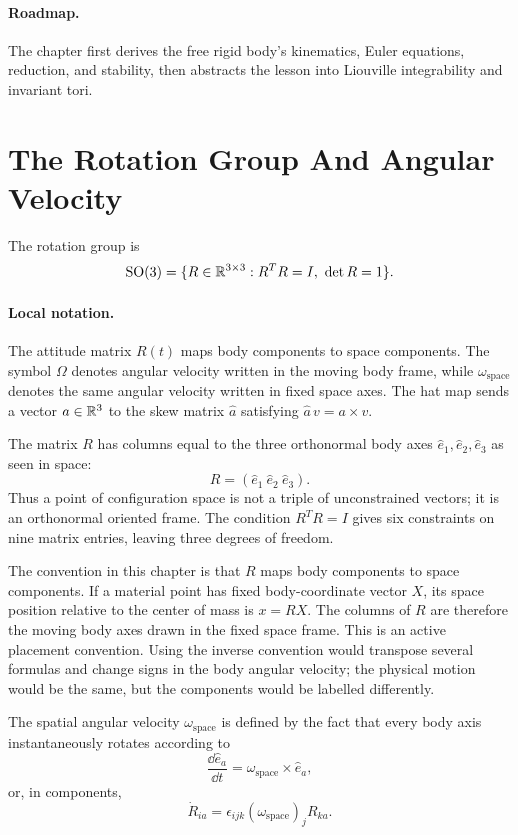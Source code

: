 \paragraph{Roadmap.}
The chapter first derives the free rigid body's kinematics, Euler equations,
reduction, and stability, then abstracts the lesson into Liouville integrability
and invariant tori.

\section{The Rotation Group And Angular Velocity}
\label{sec:rotation-group-angular-velocity}

The rotation group is
\[
  \operatorname{SO}(3)=\{R\in\mathbb{R}^{3\times 3}:R^TR=I,\ \det R=1\}.
\]

\paragraph{Local notation.}
The attitude matrix \(R(t)\) maps body components to space components.  The
symbol \(\Omega\) denotes angular velocity written in the moving body frame,
while \(\omega_{\mathrm{space}}\) denotes the same angular velocity written in
fixed space axes.  The hat map sends a vector \(a\in\mathbb{R}^3\) to the skew matrix
\(\widehat a\) satisfying \(\widehat a\,v=a\times v\).

The matrix \(R\) has columns equal to the three orthonormal body axes
\(\hat e_1,\hat e_2,\hat e_3\) as seen in space:
\[
  R=(\hat e_1\ \hat e_2\ \hat e_3).
\]
Thus a point of configuration space is not a triple of unconstrained vectors;
it is an orthonormal oriented frame. The condition \(R^TR=I\) gives six
constraints on nine matrix entries, leaving three degrees of freedom.

The convention in this chapter is that \(R\) maps body components to space
components.  If a material point has fixed body-coordinate vector \(X\), its
space position relative to the center of mass is \(x=RX\).  The columns of
\(R\) are therefore the moving body axes drawn in the fixed space frame.  This
is an active placement convention.  Using the inverse convention would transpose
several formulas and change signs in the body angular velocity; the physical
motion would be the same, but the components would be labelled differently.

The spatial angular velocity \(\omega_{\mathrm{space}}\) is defined by the fact that every body
axis instantaneously rotates according to
\[
  \frac{\dd \hat e_a}{\dd t}=\omega_{\mathrm{space}}\times\hat e_a,
\]
or, in components,
\[
  \dot R_{ia}=\epsilon_{ijk}(\omega_{\mathrm{space}})_jR_{ka}.
\]

